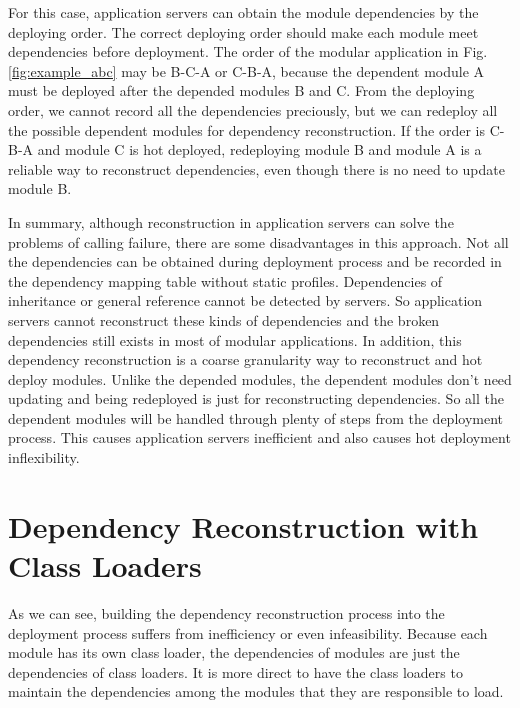 \documentclass[conference]{IEEEtran}
\begin{document}
For this case, application servers can obtain the module dependencies by the deploying order. The correct deploying order should make each module meet dependencies before deployment. The order of the modular application in Fig. \ref{fig:example_abc} may be B-C-A or C-B-A, because the dependent module A must be deployed after the depended modules B and C. From the deploying order, we cannot record all the dependencies preciously, but we can redeploy all the possible dependent modules for dependency reconstruction. If the order is C-B-A and module C is hot deployed, redeploying module B and module A is a reliable way to reconstruct dependencies, even though there is no need to update module B.

In summary, although reconstruction in application servers can solve the problems of calling failure, there are some disadvantages in this approach.
Not all the dependencies can be obtained during deployment process and be recorded in the dependency mapping table without static profiles.
Dependencies of inheritance or general reference cannot be detected by servers.
So application servers cannot reconstruct these kinds of dependencies and the broken dependencies still exists in most of modular applications.
In addition, this dependency reconstruction is a coarse granularity way to reconstruct and hot deploy modules.
Unlike the depended modules, the dependent modules don't need updating and being redeployed is just for reconstructing dependencies.
So all the dependent modules will be handled through plenty of steps from the deployment process.
This causes application servers inefficient and also causes hot deployment inflexibility.


 
 
\section{Dependency Reconstruction with Class Loaders\label{sec:reconstructionCL}}

As we can see, building the dependency reconstruction process into the deployment process suffers from inefficiency or even infeasibility. 
Because each module has its own class loader, the dependencies of modules are just the dependencies of class loaders. 
It is more direct to have the class loaders to maintain the dependencies among the modules that they are responsible to load. 
\end{document}
